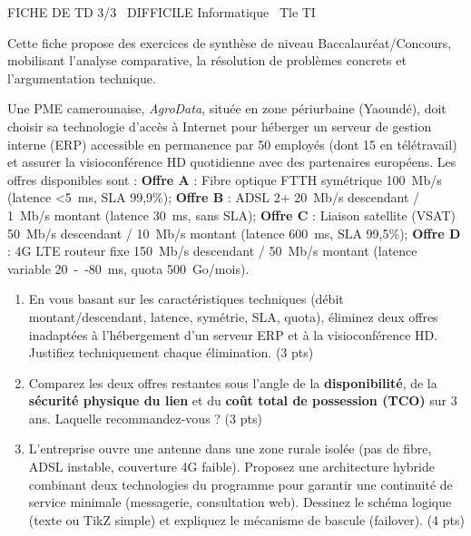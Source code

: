 \documentclass[11pt]{article}
\begin{document}
\begin{tcolorbox}[enhanced,colback=popink,colframe=popink,arc=10pt,boxrule=0pt,left=12pt,right=12pt,top=9pt,bottom=9pt]
{\color{white}\popxbold\small FICHE DE TD 3/3 \textbullet\ DIFFICILE \hfill Informatique \textbullet\ Tle TI\par}
\end{tcolorbox}
\vspace{4pt}
Cette fiche propose des exercices de synthèse de niveau Baccalauréat/Concours, mobilisant l'analyse comparative, la résolution de problèmes concrets et l'argumentation technique.

\begin{exercice}
Une PME camerounaise, \textit{AgroData}, située en zone périurbaine (Yaoundé), doit choisir sa technologie d'accès à Internet pour héberger un serveur de gestion interne (ERP) accessible en permanence par 50 employés (dont 15 en télétravail) et assurer la visioconférence HD quotidienne avec des partenaires européens. Les offres disponibles sont : \textbf{Offre A} : Fibre optique FTTH symétrique \SI{100}{Mb/s} (latence \textless \SI{5}{ms}, SLA 99,9\%); \textbf{Offre B} : ADSL 2+ \SI{20}{Mb/s} descendant / \SI{1}{Mb/s} montant (latence \SI{30}{ms}, sans SLA); \textbf{Offre C} : Liaison satellite (VSAT) \SI{50}{Mb/s} descendant / \SI{10}{Mb/s} montant (latence \SI{600}{ms}, SLA 99,5\%); \textbf{Offre D} : 4G LTE routeur fixe \SI{150}{Mb/s} descendant / \SI{50}{Mb/s} montant (latence variable \SI{20}{--}\SI{80}{ms}, quota \SI{500}{Go}/mois).
\begin{enumerate}
    \item En vous basant sur les caractéristiques techniques (débit montant/descendant, latence, symétrie, SLA, quota), éliminez deux offres inadaptées à l'hébergement d'un serveur ERP et à la visioconférence HD. Justifiez techniquement chaque élimination. (3 pts)
    \item Comparez les deux offres restantes sous l'angle de la \textbf{disponibilité}, de la \textbf{sécurité physique du lien} et du \textbf{coût total de possession (TCO)} sur 3 ans. Laquelle recommandez-vous ? (3 pts)
    \item L'entreprise ouvre une antenne dans une zone rurale isolée (pas de fibre, ADSL instable, couverture 4G faible). Proposez une architecture hybride combinant deux technologies du programme pour garantir une continuité de service minimale (messagerie, consultation web). Dessinez le schéma logique (texte ou TikZ simple) et expliquez le mécanisme de bascule (failover). (4 pts)
\end{enumerate}
\end{exercice}
\end{document}
